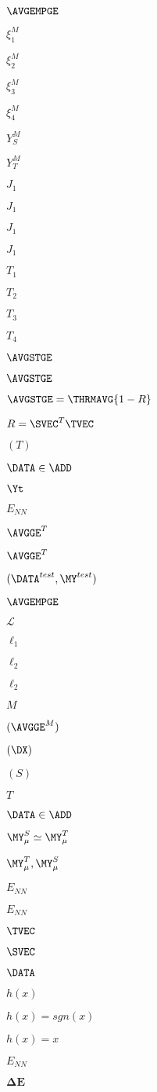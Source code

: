 
$\AVGEMPGE$

$\xi_1^M$

$\xi_2^M$

$\xi_3^M$

$\xi_4^M$

$Y_S^M$

$Y_T^M$

$J_1$

$J_1$

$J_1$

$J_1$

$T_1$

$T_2$

$T_3$

$T_4$

$\AVGSTGE$

$\AVGSTGE$

$\AVGSTGE=\THRMAVG{1-R}$

$R=\SVEC^{T}\TVEC$

$(T)$

$\DATA\in\ADD$

$\Yt$

$E_{NN}$

$\AVGGE^{T}$

$\AVGGE^{T}$

$(\DATA^{test}, \MY^{test})$

$\AVGEMPGE$

$\mathcal{L}$

$\ell_1$

$\ell_2$

$\ell_2$

$M$

$(\AVGGE^{M})$

$(\DX)$

$(S)$

$T$

$\DATA\in\ADD$

$\MY^{S}_{\mu}\simeq \MY^{T}_{\mu}$

$\MY^{T}_{\mu}, \MY^{S}_{\mu}$

$E_{NN}$

$E_{NN}$

$\TVEC$

$\SVEC$

$\DATA$

$h(x)$

$h(x)=sgn(x)$

$h(x)=x$

$E_{NN}$

$\mathbf{\Delta E}$

